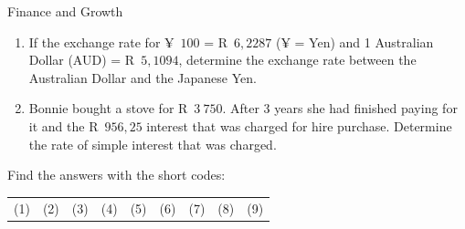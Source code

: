 \begin{eocexercises}{Finance and Growth}
\begin{enumerate}[label=\textbf{\arabic*}.]
	\item If the exchange rate for ¥~$100$ = R~$6,2287$ (¥ = Yen) and 1 Australian Dollar (AUD) = R~$5,1094$, determine the exchange rate between the Australian Dollar and the Japanese Yen.

	\item Bonnie bought a stove for R~$3~750$. After 3 years she had finished paying for it and the R~$956,25$ interest that was charged for hire purchase. Determine the rate of simple interest that was charged.
    \end{enumerate}

    Find the answers with the short codes:\\
    \begin{tabularx}{\textwidth}{ XXXXXXXXX }
	(1) & (2) & (3) & (4) & (5) & (6) & (7) & (8) & (9)\\
    \end{tabularx}
\end{eocexercises}
